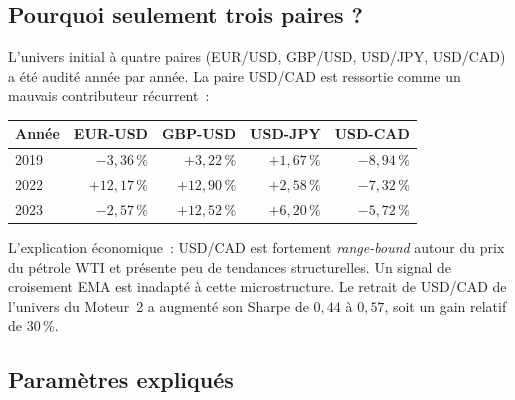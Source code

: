 \documentclass[11pt, a4paper]{scrartcl}
\begin{document}
\subsection{Pourquoi seulement trois paires ?}

L'univers initial à quatre paires (EUR/USD, GBP/USD, USD/JPY, USD/CAD) a été audité année par année. La paire USD/CAD est ressortie comme un mauvais contributeur récurrent~:

\begin{center}
\renewcommand{\arraystretch}{1.1}
\begin{tabular}{lrrrr}
\toprule
\textbf{Année} & \textbf{EUR-USD} & \textbf{GBP-USD} & \textbf{USD-JPY} & \textbf{USD-CAD} \\
\midrule
2019 & $-3{,}36\,\%$ & $+3{,}22\,\%$ & $+1{,}67\,\%$ & \textcolor{combinedBurgundy}{$-8{,}94\,\%$} \\
2022 & $+12{,}17\,\%$ & $+12{,}90\,\%$ & $+2{,}58\,\%$ & \textcolor{combinedBurgundy}{$-7{,}32\,\%$} \\
2023 & $-2{,}57\,\%$ & $+12{,}52\,\%$ & $+6{,}20\,\%$ & \textcolor{combinedBurgundy}{$-5{,}72\,\%$} \\
\bottomrule
\end{tabular}
\end{center}

L'explication économique~: USD/CAD est fortement \emph{range-bound} autour du prix du pétrole WTI et présente peu de tendances structurelles. Un signal de croisement EMA est inadapté à cette microstructure. Le retrait de USD/CAD de l'univers du Moteur~2 a augmenté son Sharpe de $0{,}44$ à $0{,}57$, soit un gain relatif de $30\,\%$.

\subsection{Paramètres expliqués}
\end{document}
